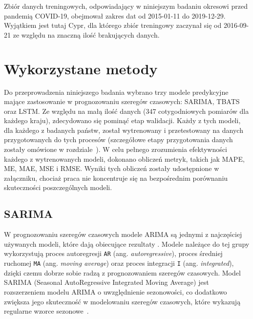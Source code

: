 \documentclass[polish, twoside, 12pt, a4paper]{article}
\theoremstyle{definition}
\theoremstyle{plain}
\theoremstyle{remark}
\newcommand{\code}[1]{\lstinline{#1}}
\begin{document}
Zbiór danych treningowych, odpowiadający w niniejszym badaniu okresowi przed pandemią COVID-19, obejmował zakres dat od 2015-01-11 do 2019-12-29. Wyjątkiem jest tutaj Cypr, dla którego zbiór treningowy zaczynał się od 2016-09-21 ze względu na znaczną ilość brakujących danych. 

\clearpage
\section{Wykorzystane metody}\label{sec:metody}

Do przeprowadzenia niniejszego badania wybrano trzy modele predykcyjne mające zastosowanie w prognozowaniu szeregów czasowych: SARIMA, TBATS oraz LSTM. Ze względu na małą ilość danych (347 cotygodniowych pomiarów dla każdego kraju), zdecydowano się pominąć etap walidacji. Każdy z tych modeli, dla każdego z badanych państw, został wytrenowany i przetestowany na danych przygotowanych do tych procesów (szczegółowe etapy przygotowania danych zostały omówione w rozdziale~\textit{}). W celu pełnego zrozumienia efektywności każdego z wytrenowanych modeli, dokonano obliczeń metryk, takich jak MAPE, ME, MAE, MSE i RMSE. Wyniki tych obliczeń zostały udostępnione w załączniku, chociaż praca nie koncentruje się na bezpośrednim porównaniu skuteczności poszczególnych modeli.

\subsection{SARIMA}

W prognozowaniu szeregów czasowych modele ARIMA są jednymi z najczęściej używanych modeli, które dają obiecujące rezultaty \citep{elsaraiti2021}. Modele należące do tej grupy wykorzystują proces autoregresji \code{AR} (ang. \textit{autoregressive}), proces średniej ruchomej \code{MA} (ang. \textit{moving average}) oraz proces integracji \code{I} (ang. \textit{integrated}), dzięki czemu dobrze sobie radzą z prognozowaniem szeregów czasowych. Model SARIMA (Seasonal AutoRegressive Integrated Moving Average) jest rozszerzeniem modelu ARIMA o uwzględnienie sezonowości, co dodatkowo zwiększa jego skuteczność w modelowaniu szeregów czasowych, które wykazują regularne wzorce sezonowe~\citep{montgomery2011}. 
\end{document}
